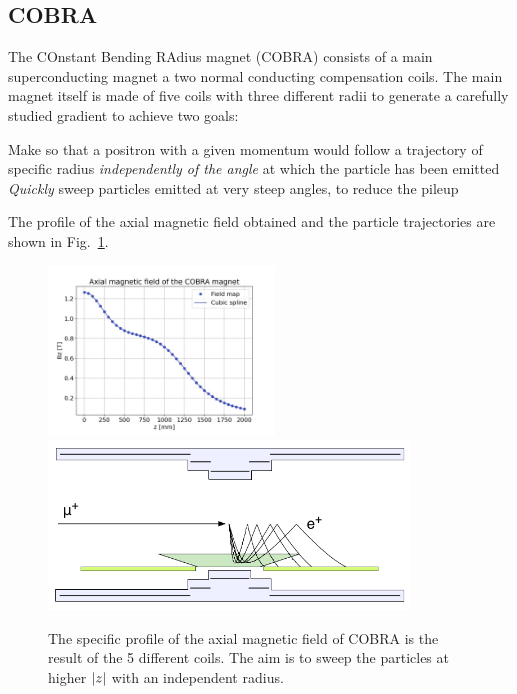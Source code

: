 \begin{refsection}
    \subsection{COBRA}
    \label{MEG:COBRA}
        The COnstant Bending RAdius magnet (COBRA) consists of a main superconducting magnet a two normal conducting compensation coils.
        The main magnet itself is made of five coils with three different radii to generate a carefully studied gradient to achieve two goals:
        \begin{outline}
            \1 Make so that a positron with a given momentum would follow a trajectory of specific radius \textit{independently of the angle} at which the particle has been emitted
            \1 \textit{Quickly} sweep particles emitted at very steep angles, to reduce the pileup
        \end{outline}
        The profile of the axial magnetic field obtained and the particle trajectories are shown in Fig.~\ref{fig:MEGII:COBRA:B}.
        
        \begin{figure}
            \centering
            \includegraphics[height = 4.5cm]{Figures/MEG/COBRA_B.jpeg}
            \includegraphics[height = 4.5cm]{Figures/MEG/cobra_effect_meg1.png}
            \caption{The specific profile of the axial magnetic field of COBRA is the result of the 5 different coils. The aim is to sweep the particles at higher $\abs{z}$ with an independent radius.}
            \label{fig:MEGII:COBRA:B}
        \end{figure}
        

\end{refsection}

